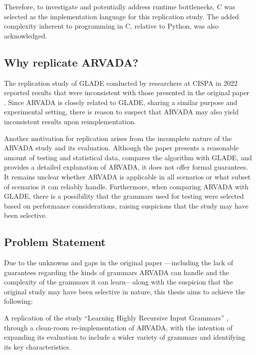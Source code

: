 \vspace{\baselineskip}

Therefore, to investigate and potentially address runtime bottlenecks, C was selected as the implementation language for this replication study. The added complexity inherent to programming in C, relative to Python, was also acknowledged.

\subsection{Why replicate ARVADA?}
The replication study of GLADE \cite{bastaniSynthesizingProgramInput} conducted by researchers at CISPA \cite{bendrissouSynthesizingInputGrammars2022} in 2022 reported results that were inconsistent with those presented in the original paper \cite{bastaniSynthesizingProgramInput}. Since ARVADA is closely related to GLADE, sharing a similar purpose and experimental setting, there is reason to suspect that ARVADA may also yield inconsistent results upon reimplementation.

\vspace{\baselineskip}

Another motivation for replication arises from the incomplete nature of the ARVADA study and its evaluation. Although the paper presents a reasonable amount of testing and statistical data, compares the algorithm with GLADE, and provides a detailed explanation of ARVADA, it does not offer formal guarantees. It remains unclear whether ARVADA is applicable in all scenarios or what subset of scenarios it can reliably handle. Furthermore, when comparing ARVADA with GLADE, there is a possibility that the grammars used for testing were selected based on performance considerations, raising suspicions that the study may have been selective.


\subsection{Problem Statement}

Due to the unknowns and gaps in the original paper \cite{kulkarniLearningHighlyRecursive2021}—including the lack of guarantees regarding the kinds of grammars ARVADA can handle and the complexity of the grammars it can learn—along with the suspicion that the original study may have been selective in nature, this thesis aims to achieve the following:

\vspace{\baselineskip}
A replication of the study “Learning Highly Recursive Input Grammars” \cite{kulkarniLearningHighlyRecursive2021}, through a clean-room re-implementation of ARVADA, with the intention of expanding its evaluation to include a wider variety of grammars and identifying its key characteristics.

